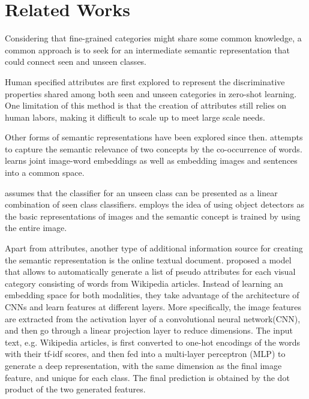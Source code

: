 \documentclass{article}
\begin{document}
\section{Related Works}    
Considering that fine-grained categories might share some common knowledge, a common approach is to seek for an intermediate semantic representation that could connect seen and unseen classes.   \par 

Human specified attributes are first explored to represent the discriminative properties shared among both seen and unseen categories in zero-shot learning\cite{torresani2010efficient, lampert2009learning}. One limitation of this method is that the creation of attributes still relies on human labors, making it difficult to scale up to meet large scale needs. \par 

Other forms of semantic representations have been explored since then. \cite{mensink2014costa} attempts to capture the semantic relevance of two concepts by the co-occurrence of words. \cite{frome2013devise} learns joint image-word embeddings as well as embedding
images and sentences into a common space. 
  
\cite{mensink2014costa,romera2015embarrassingly} assumes that the classifier for an unseen class can be presented as a linear combination of seen class classifiers. \cite{torresani2010efficient} employs the idea of using object detectors as the basic representations of images and the semantic concept is trained by using the entire image.   

Apart from attributes, another type of additional information source for creating the semantic representation is the online textual document. \cite{Ba_2015_ICCV} proposed a model that allows  to automatically generate a list of pseudo attributes for each visual category consisting of words from Wikipedia articles. Instead of learning an embedding space for both modalities, they take advantage of the architecture of CNNs and learn features at different layers. More specifically, the image features are extracted from the activation layer of a convolutional neural network(CNN), and then go through a linear projection layer to reduce dimensions. The input text, e.g. Wikipedia articles, is first converted to one-hot encodings of the words with their tf-idf scores, and then fed into a multi-layer perceptron (MLP) to generate a deep representation, with the same dimension as the final image feature, and unique for each class. The final prediction is obtained by the dot product of the two generated features. \\
	
\end{document}
